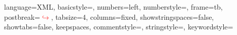 






 {
	language=XML,		%
	basicstyle=\footnotesize\ttfamily,
	numbers=left,
	numberstyle=\tiny{},
	frame=tb,
	postbreak=\mbox{\textcolor{red}{$\hookrightarrow$}\space},
	tabsize=4,
	columns=fixed,
	showstringspaces=false,
	showtabs=false,
	keepspaces,
	commentstyle=\color{red},
	stringstyle=\color{orange},		%
	keywordstyle=\color{blue}
}





%



